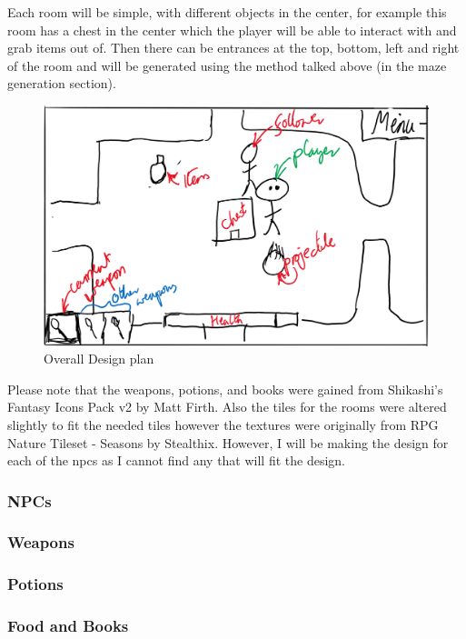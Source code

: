 \documentclass[../Main.tex]{subfiles}
\begin{document}
            Each room will be simple, with different objects in the center, for example this room has a chest in the center which the player will be able to interact with and grab items out of. Then there can be entrances at the top, bottom, left and right of the room and will be generated using the method talked above (in the maze generation section).
            \begin{figure}[hbt!]
                \centerline{\includegraphics[scale=0.3]{img/Design/Overall Design.png}}
                \caption{Overall Design plan}
                \label{fig}
            \end{figure}

            Please note that the weapons, potions, and books were gained from Shikashi's Fantasy Icons Pack v2 by Matt Firth. Also the tiles for the rooms were altered slightly to fit the needed tiles however the textures were originally from RPG Nature Tileset - Seasons by Stealthix. However, I will be making the design for each of the npcs as I cannot find any that will fit the design.
        \subsubsection{NPCs} %
        \subsubsection{Weapons}
        \subsubsection{Potions}
        \subsubsection{Food and Books}
\end{document}
